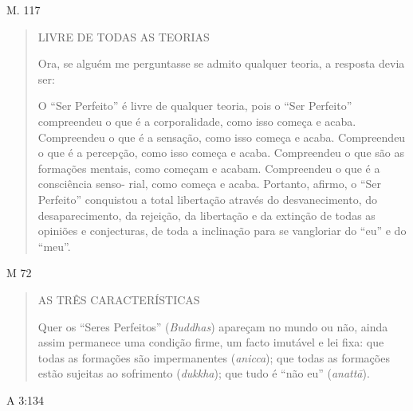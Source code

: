 M. 117

\begin{quote}
LIVRE DE TODAS AS TEORIAS

Ora, se alguém me perguntasse se admito qualquer teoria, a resposta devia ser:

O ``Ser Perfeito'' é livre de qualquer teoria, pois o ``Ser Perfeito'' compreendeu o que é a corporalidade, como isso começa e acaba. Compreendeu o que é a sensação, como isso começa e acaba. Compreendeu o que é a percepção, como isso começa e acaba. Compreendeu o que são as formações mentais, como começam e acabam. Compreendeu o que é a consciência senso- rial, como começa e acaba. Portanto, afirmo, o ``Ser Perfeito'' conquistou a total libertação através do desvanecimento, do desaparecimento, da rejeição, da libertação e da extinção de todas as opiniões e conjecturas, de toda a inclinação para se vangloriar do ``eu'' e do ``meu''.
\end{quote}

M 72

\begin{quote}
AS TRÊS CARACTERÍSTICAS

Quer os ``Seres Perfeitos'' (\emph{Buddhas}) apareçam no mundo ou não, ainda assim permanece uma condição firme, um facto imutável e lei fixa: que todas as formações são impermanentes (\emph{anicca}); que todas as formações estão sujeitas ao sofrimento (\emph{dukkha}); que tudo é ``não eu'' (\emph{anattā}).
\end{quote}

A 3:134

